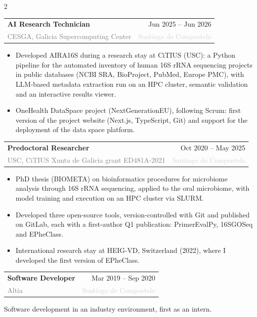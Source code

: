 \documentclass[10pt, a4paper]{article}
\makeatletter
\newcommand{\cventry}[4]{%
  \begin{tabularx}{\linewidth}{@{}Xr@{}}
    \textbf{#1} & \textcolor{lightaccent}{\small #3} \\
    \textcolor{gray}{#2} & \textcolor{lightgray}{\small #4}
  \end{tabularx}\par\vspace{1pt}}
\makeatother
\begin{document}
\begin{paracol}{2}
\cventry{AI Research Technician}{CESGA, Galicia Supercomputing Center}{Jun 2025 -- Jun 2026}{Santiago de Compostela}
\begin{itemize}
  \item Developed AIRA16S during a research stay at CiTIUS (USC): a Python pipeline for the automated inventory of human 16S rRNA sequencing projects in public databases (NCBI SRA, BioProject, PubMed, Europe PMC), with LLM-based metadata extraction run on an HPC cluster, semantic validation and an interactive results viewer.
  \item OneHealth DataSpace project (NextGenerationEU), following Scrum: first version of the project website (Next.js, TypeScript, Git) and support for the deployment of the data space platform.
\end{itemize}
\vspace{6pt}

\cventry{Predoctoral Researcher}{USC, CiTIUS \textperiodcentered{} Xunta de Galicia grant ED481A-2021}{Oct 2020 -- May 2025}{Santiago de Compostela}
\begin{itemize}
  \item PhD thesis (BIOMETA) on bioinformatics procedures for microbiome analysis through 16S rRNA sequencing, applied to the oral microbiome, with model training and execution on an HPC cluster via SLURM.
  \item Developed three open-source tools, version-controlled with Git and published on GitLab, each with a first-author Q1 publication: PrimerEvalPy, 16SGOSeq and EPheClass.
  \item International research stay at HEIG-VD, Switzerland (2022), where I developed the first version of EPheClass.
\end{itemize}
\vspace{6pt}

\cventry{Software Developer}{Altia}{Mar 2019 -- Sep 2020}{Santiago de Compostela}
{\small\color{gray} Software development in an industry environment, first as an intern.}\par


\end{paracol}
\end{document}
